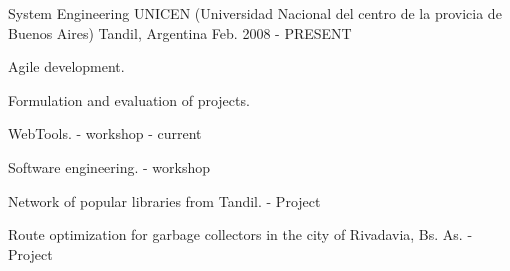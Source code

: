 


\begin{cventries}


\cventry
{System Engineering} %
{UNICEN (Universidad Nacional del centro de la provicia de Buenos Aires)} %
{Tandil, Argentina} %
{Feb. 2008 - PRESENT} %
{ %
\begin{cvitems}
\item {Agile development.}
\item {Formulation and evaluation of projects.}
\item {WebTools. - workshop - current}
\item {Software engineering. - workshop}
\item {Network of popular libraries from Tandil. - Project}
\item {Route optimization for garbage collectors in the city of Rivadavia, Bs. As. - Project}
\end{cvitems}
}


\end{cventries}
